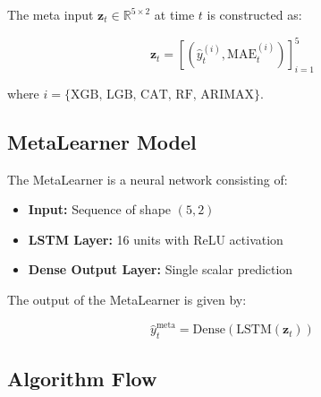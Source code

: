 The meta input $\mathbf{z}_t \in \mathbb{R}^{5 \times 2}$ at time $t$ is constructed as:

\begin{equation}
\mathbf{z}_t = \left[ \left( \hat{y}_t^{(i)}, \text{MAE}_t^{(i)} \right) \right]_{i=1}^5
\end{equation}

where $i = \{ \text{XGB, LGB, CAT, RF, ARIMAX} \}$.

\subsection{MetaLearner Model}

The MetaLearner is a neural network consisting of:
\begin{itemize}
    \item \textbf{Input:} Sequence of shape $(5, 2)$
    \item \textbf{LSTM Layer:} 16 units with ReLU activation
    \item \textbf{Dense Output Layer:} Single scalar prediction
\end{itemize}

The output of the MetaLearner is given by:

\begin{equation}
\hat{y}_t^{\text{meta}} = \text{Dense} \left( \text{LSTM}(\mathbf{z}_t) \right)
\end{equation}

\subsection{Algorithm Flow}


